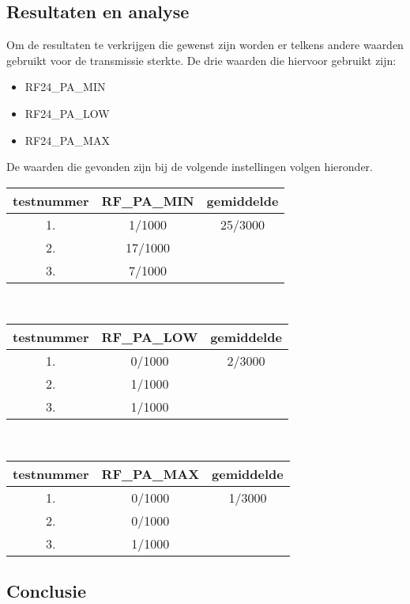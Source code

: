 \documentclass{article}
\begin{document}
\subsection{Resultaten en analyse}
Om de resultaten te verkrijgen die gewenst zijn worden er telkens andere waarden gebruikt voor de transmissie sterkte. De drie waarden die hiervoor gebruikt zijn:\\
\begin{itemize}
	\item RF24\_PA\_MIN
	\item RF24\_PA\_LOW
	\item RF24\_PA\_MAX
\end{itemize}
De waarden die gevonden zijn bij de volgende instellingen volgen hieronder. 
\begin{tabular}{c||c || c}
\textbf{testnummer}   & \textbf{RF\_PA\_MIN}  & \textbf{gemiddelde} \\ \hline
1. & 1/1000   & 25/3000\\
2. & 17/1000 & 	\\
3. & 7/1000  &   
\end{tabular}

\\
\begin{tabular}{c||c || c}
\textbf{testnummer}   & \textbf{RF\_PA\_LOW}  & \textbf{gemiddelde} \\ \hline
1. & 0/1000   & 2/3000\\
2. & 1/1000 & 	\\
3. & 1/1000  &   
\end{tabular}
\\

\begin{tabular}{c||c || c}
\textbf{testnummer}   & \textbf{RF\_PA\_MAX}  & \textbf{gemiddelde} \\ \hline
1. & 0/1000   & 1/3000\\
2. & 0/1000 & 	\\
3. & 1/1000  &   
\end{tabular}
\subsection{Conclusie}

\clearpage
\appendix
\end{document}
